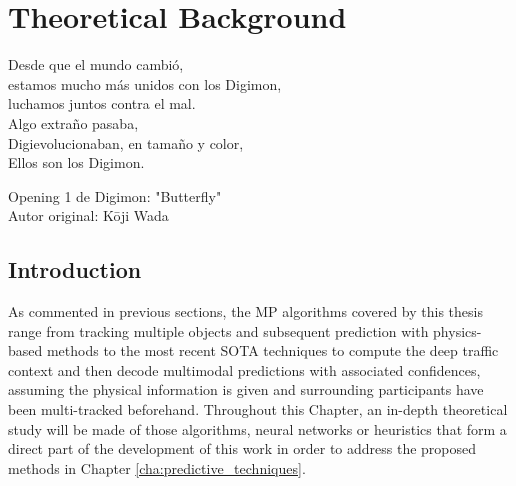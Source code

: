 % 
% 
% 
% 
% 
% 
% 

\chapter{Theoretical Background}
\label{cha:theoretical_background}

\begin{FraseCelebre}
	\begin{Frase}
		Desde que el mundo cambió, \\
		estamos mucho más unidos con los Digimon, \\
		luchamos juntos contra el mal. \\ 

		Algo extraño pasaba, \\
		Digievolucionaban, en tamaño y color, \\
		Ellos son los Digimon. \\
	\end{Frase}
	\begin{Fuente}
		Opening 1 de Digimon: "Butterfly" \\
		Autor original: Kōji Wada
	\end{Fuente}
\end{FraseCelebre}

\section{Introduction}
\label{sec:3_introduction}

As commented in previous sections, the \ac{MP} algorithms covered by this thesis range from tracking multiple objects and subsequent prediction with physics-based methods to the most recent \ac{SOTA} techniques to compute the deep traffic context and then decode multimodal predictions with associated confidences, assuming the physical information is given and surrounding participants have been multi-tracked beforehand. Throughout this Chapter, an in-depth theoretical study will be made of those algorithms, neural networks or heuristics that form a direct part of the development of this work in order to address the proposed methods in Chapter \ref{cha:predictive_techniques}. \\

